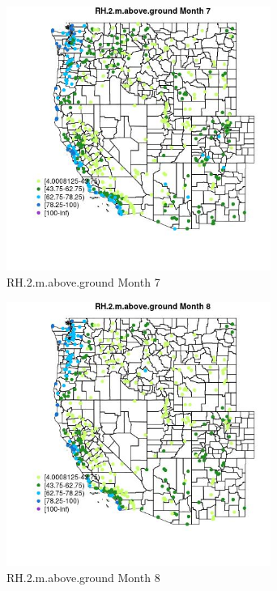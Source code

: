 \begin{figure} 
\centering  
\includegraphics[width=0.77\textwidth]{Code_Outputs/Report_ML_input_PM25_Step4_part_e_de_duplicated_aves_compiled_2019-05-14wNAs_MapObsMo7RH2maboveground.jpg} 
\caption{\label{fig:Report_ML_input_PM25_Step4_part_e_de_duplicated_aves_compiled_2019-05-14wNAsMapObsMo7RH2maboveground}RH.2.m.above.ground Month 7} 
\end{figure} 
 

\begin{figure} 
\centering  
\includegraphics[width=0.77\textwidth]{Code_Outputs/Report_ML_input_PM25_Step4_part_e_de_duplicated_aves_compiled_2019-05-14wNAs_MapObsMo8RH2maboveground.jpg} 
\caption{\label{fig:Report_ML_input_PM25_Step4_part_e_de_duplicated_aves_compiled_2019-05-14wNAsMapObsMo8RH2maboveground}RH.2.m.above.ground Month 8} 
\end{figure} 
 

